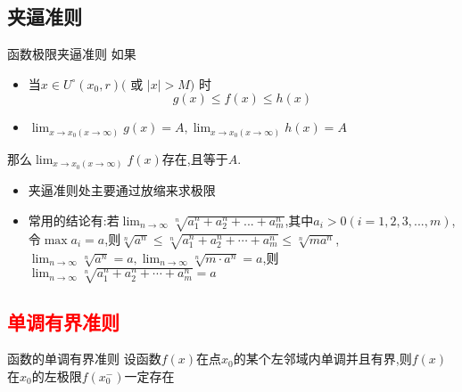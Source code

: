 \documentclass[12pt, a4paper, oneside, UTF8]{ctexbook}
\begin{document}
\begin{sloppypar}
    \subsection{夹逼准则}
    \begin{defn}{函数极限夹逼准则}{}
        如果
        \begin{itemize}
            \item 当$x\in U^{\circ}(x_{0},r)($ 或 $|x|>M)$ 时
                  $$
                      g(x)\leqslant f(x) \leqslant h(x)
                  $$
            \item $\lim_{x\to x_0(x\to\infty)}g(x)=A,\lim_{x\to x_0(x\to\infty)}h(x)=A$
        \end{itemize}
        那么$\lim_{x\to x_0(x\to\infty)}f(x)$存在,且等于$A$.
    \end{defn}
    \begin{itemize}
        \item 夹逼准则处主要通过放缩来求极限
        \item 常用的结论有:若$\lim _{n \to \infty} \sqrt[n]{a_1^n+a_2^n+...+a_m^n}$,其中$a_i >0(i=1,2,3,...,m)$,令$\max{a_i}=a$,则$\sqrt[n]{a^n}\leqslant\sqrt[n]{a_1^n+a_2^n+\cdots+a_m^n}\leqslant\sqrt[n]{ma^n}$,\\$\lim_{n\to\infty}\sqrt[n]{a^n}=a,\lim_{n\to\infty}\sqrt[n]{m\cdot a^n}=a$,则$\operatorname*{lim}_{n\to\infty}\sqrt[n]{a_1^n+a_2^n+\cdots+a_m^n}=a$
    \end{itemize}
    \subsection{\textcolor{red}{单调有界准则}}
    \begin{defn}{函数的单调有界准则}{}
        设函数$f(x)$在点$x_0$的某个左邻域内单调并且有界,则$f(x)$在$x_0$的左极限$f(x_0^-)$一定存在
    \end{defn} 

\end{sloppypar}
\end{document}
